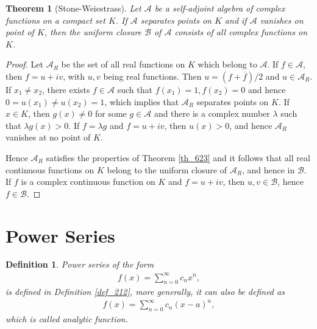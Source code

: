 \documentclass[11pt]{book}
\newtheorem{definition}{Definition}[chapter]
\newtheorem{theorem}{Theorem}[chapter]
\theoremstyle{definition}
\numberwithin{equation}{chapter}
\begin{document}
\begin{theorem}[Stone-Weiestrass]\label{th_624}
Let $\mathscr{A}$ be a self-adjoint algebra of complex functions on a compact set $K$. If $\mathscr{A}$ separates points on $K$ and if $\mathscr{A}$ vanishes on point of $K$, then the uniform closure $\mathscr{B}$ of $\mathscr{A}$ consists of all complex functions on $K$.
\end{theorem}
\begin{proof}
Let $\mathscr{A}_R$ be the set of all real functions on $K$ which belong to $\mathscr{A}$. If $f \in \mathscr{A}$, then $f = u + iv$, with $u,v$ being real functions. Then $u = (f + \overline{f})/2$ and $u \in \mathscr{A}_R$. If $x_1 \neq x_2$, there exists $f \in \mathscr{A}$ such that $f(x_1) = 1, f(x_2) = 0$ and hence $0 = u(x_1) \neq u(x_2) = 1$, which implies that $\mathscr{A}_R$ separates points on $K$. If $x \in K$, then $g(x) \neq 0$ for some $g \in \mathscr{A}$ and there is a complex number $\lambda$ such that $\lambda g(x) > 0$. If $f = \lambda g$ and $f = u + iv$, then $u(x) > 0$, and hence $\mathscr{A}_R$ vanishes at no point of $K$.

Hence $\mathscr{A}_R$ satisfies the properties of Theorem \ref{th_623} and it follows that all real continuous functions on $K$ belong to the uniform closure of $\mathscr{A}_R$, and hence in $\mathscr{B}$. If $f$ is a complex continuous function on $K$ and $f = u + iv$, then $u,v \in \mathscr{B}$, hence $f \in \mathscr{B}$.
\end{proof}



\medskip

\section{Power Series}

\begin{definition}
Power series of the form
\begin{align*}
    f(x) = \sum^\infty_{n=0} c_n x^n,
\end{align*}
is defined in Definition \ref{def_212}, more generally, it can also be defined as
\begin{align*}
    f(x) = \sum^\infty_{n=0} c_n (x - a)^n,
\end{align*}
which is called analytic function.
\end{definition}

\medskip
\end{document}
